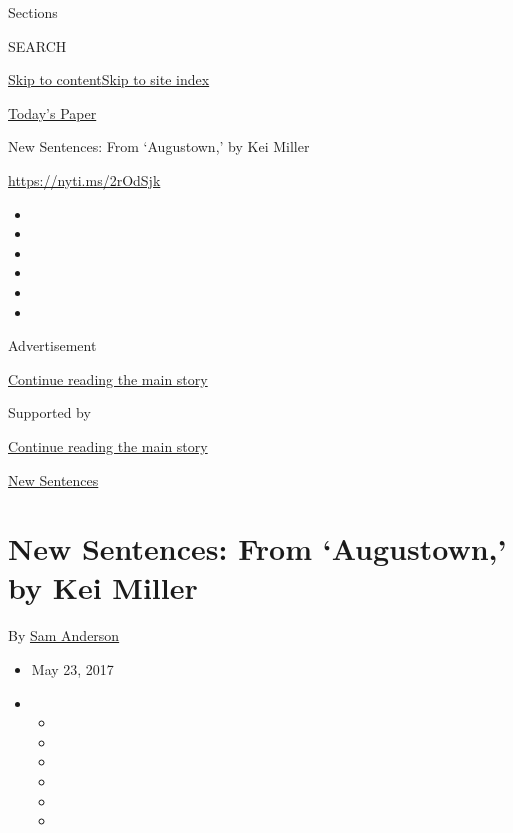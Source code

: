 Sections

SEARCH

\protect\hyperlink{site-content}{Skip to
content}\protect\hyperlink{site-index}{Skip to site index}

\href{https://myaccount.nytimes3xbfgragh.onion/auth/login?response_type=cookie\&client_id=vi}{}

\href{https://www.nytimes3xbfgragh.onion/section/todayspaper}{Today's
Paper}

New Sentences: From `Augustown,' by Kei Miller

\url{https://nyti.ms/2rOdSjk}

\begin{itemize}
\item
\item
\item
\item
\item
\item
\end{itemize}

Advertisement

\protect\hyperlink{after-top}{Continue reading the main story}

Supported by

\protect\hyperlink{after-sponsor}{Continue reading the main story}

\href{/column/new-sentences}{New Sentences}

\hypertarget{new-sentences-from-augustown-by-kei-miller}{%
\section{New Sentences: From `Augustown,' by Kei
Miller}\label{new-sentences-from-augustown-by-kei-miller}}

By \href{http://www.nytimes3xbfgragh.onion/by/sam-anderson}{Sam
Anderson}

\begin{itemize}
\item
  May 23, 2017
\item
  \begin{itemize}
  \item
  \item
  \item
  \item
  \item
  \item
  \end{itemize}
\end{itemize}

